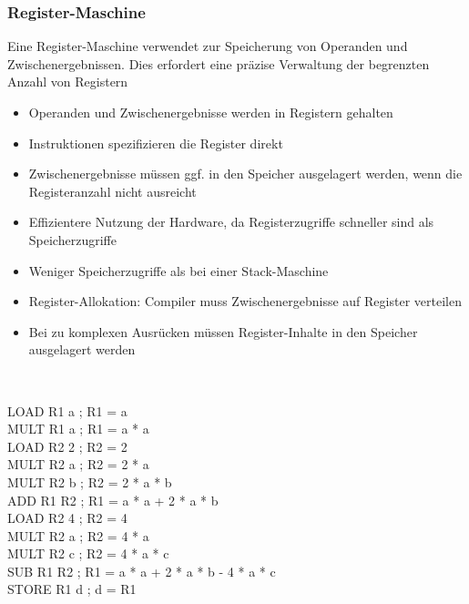 \subsubsection{Register-Maschine}
Eine Register-Maschine verwendet  zur Speicherung von Operanden und Zwischenergebnissen. Dies erfordert eine präzise Verwaltung der begrenzten Anzahl von Registern\\
\begin{itemize}
    \item Operanden und Zwischenergebnisse werden in Registern gehalten
    \item Instruktionen spezifizieren die Register direkt
    \item Zwischenergebnisse müssen ggf. in den Speicher ausgelagert werden, wenn die Registeranzahl nicht ausreicht
\end{itemize}
\begin{itemize}
    \item Effizientere Nutzung der Hardware, da Registerzugriffe schneller sind als Speicherzugriffe
    \item Weniger Speicherzugriffe als bei einer Stack-Maschine
\end{itemize}
\begin{itemize}
    \item Register-Allokation: Compiler muss Zwischenergebnisse auf Register verteilen
    \item Bei zu komplexen Ausrücken müssen Register-Inhalte in den Speicher ausgelagert werden
\end{itemize}
\\
\begin{defBox}
    LOAD  R1 a    ; R1 = a\\
    MULT  R1 a    ; R1 = a * a\\
    LOAD  R2 2    ; R2 = 2\\
    MULT  R2 a    ; R2 = 2 * a\\
    MULT  R2 b    ; R2 = 2 * a * b\\
    ADD   R1 R2   ; R1 = a * a + 2 * a * b\\
    LOAD  R2 4    ; R2 = 4\\
    MULT  R2 a    ; R2 = 4 * a\\
    MULT  R2 c    ; R2 = 4 * a * c\\
    SUB   R1 R2   ; R1 = a * a + 2 * a * b - 4 * a * c\\
    STORE R1 d    ; d = R1\\
\end{defBox}